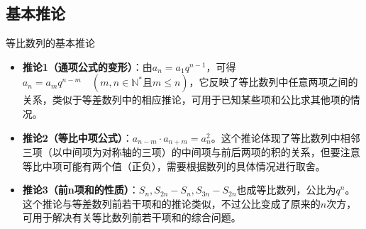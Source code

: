 \documentclass[aspectratio=169]{ctexbeamer} %
\begin{document}
\subsection{基本推论}
\begin{frame}{等比数列的基本推论}
\begin{itemize}
\item \textbf{推论1（通项公式的变形）}：由$a_n = a_1 q^{n-1}$，可得$a_n = a_m q^{n-m}\quad(m, n \in \mathbb{N}^* \text{且} m \leq n)$，它反映了等比数列中任意两项之间的关系，类似于等差数列中的相应推论，可用于已知某些项和公比求其他项的情况。
\item \textbf{推论2（等比中项公式）}：$a_{n-m} \cdot a_{n+m} = a_n^2$。这个推论体现了等比数列中相邻三项（以中间项为对称轴的三项）的中间项与前后两项的积的关系，但要注意等比中项可能有两个值（正负），需要根据数列的具体情况进行取舍。
\item \textbf{推论3（前n项和的性质）}：$S_n, S_{2n} - S_n, S_{3n} - S_{2n}$也成等比数列，公比为$q^n$。这个推论与等差数列前若干项和的推论类似，不过公比变成了原来的$n$次方，可用于解决有关等比数列前若干项和的综合问题。
\end{itemize}
\end{frame}
\end{document}
